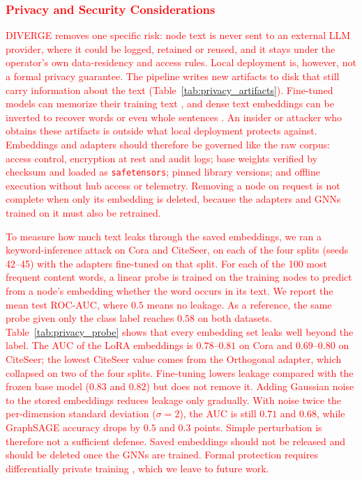 \documentclass[a4paper,fleqn]{cas-sc}
\newcommand{\revone}[1]{\textcolor{red}{#1}}   %
\begin{document}
\subsubsection{\revone{Privacy and Security Considerations}}\label{sec:privacy}

\revone{DIVERGE removes one specific risk: node text is never sent to an external LLM provider, where it could be logged, retained or reused, and it stays under the operator's own data-residency and access rules. Local deployment is, however, not a formal privacy guarantee. The pipeline writes new artifacts to disk that still carry information about the text (Table~\ref{tab:privacy_artifacts}). Fine-tuned models can memorize their training text \citep{carlini2021extracting}, and dense text embeddings can be inverted to recover words or even whole sentences \citep{song2020information, morris2023text}. An insider or attacker who obtains these artifacts is outside what local deployment protects against. Embeddings and adapters should therefore be governed like the raw corpus: access control, encryption at rest and audit logs; base weights verified by checksum and loaded as \texttt{safetensors}; pinned library versions; and offline execution without hub access or telemetry. Removing a node on request is not complete when only its embedding is deleted, because the adapters and GNNs trained on it must also be retrained.}

\revone{To measure how much text leaks through the saved embeddings, we ran a keyword-inference attack on Cora and CiteSeer, on each of the four splits (seeds 42--45) with the adapters fine-tuned on that split. For each of the 100 most frequent content words, a linear probe is trained on the training nodes to predict from a node's embedding whether the word occurs in its text. We report the mean test ROC-AUC, where $0.5$ means no leakage. As a reference, the same probe given only the class label reaches $0.58$ on both datasets. Table~\ref{tab:privacy_probe} shows that every embedding set leaks well beyond the label. The AUC of the LoRA embeddings is $0.78$--$0.81$ on Cora and $0.69$--$0.80$ on CiteSeer; the lowest CiteSeer value comes from the Orthogonal adapter, which collapsed on two of the four splits. Fine-tuning lowers leakage compared with the frozen base model ($0.83$ and $0.82$) but does not remove it. Adding Gaussian noise to the stored embeddings reduces leakage only gradually. With noise twice the per-dimension standard deviation ($\sigma=2$), the AUC is still $0.71$ and $0.68$, while GraphSAGE accuracy drops by $0.5$ and $0.3$ points. Simple perturbation is therefore not a sufficient defense. Saved embeddings should not be released and should be deleted once the GNNs are trained. Formal protection requires differentially private training \citep{abadi2016deep}, which we leave to future work.}
\end{document}
